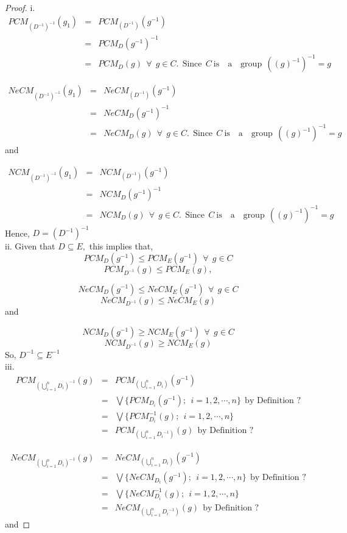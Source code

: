 \documentclass[12pt,letterpaper]{amsart}
\newcommand{\dis}{\displaystyle}
\theoremstyle{plain}
\theoremstyle{definition}
\numberwithin{equation}{section}
\begin{document}
\begin{proof}
i.
\begin{eqnarray*}
PCM_{(D^{-1})^{-1}}(g_1) & = & PCM_{(D^{-1})}(g^{-1})\\
& = & PCM_D(g^{-1})^{-1} \\
& = & PCM_D(g)~~ \forall~~ g \in C.~~ \text{Since}~~ C ~ \text{is~~ a~~ group}~~((g)^{-1})^{-1} = g
\end{eqnarray*}

\begin{eqnarray*}
NeCM_{(D^{-1})^{-1}}(g_1) & = & NeCM_{(D^{-1})}(g^{-1})\\
& = & NeCM_D(g^{-1})^{-1} \\
& = & NeCM_D(g)~~ \forall~~ g \in C.~~ \text{Since}~~ C ~ \text{is~~ a~~ group}~~((g)^{-1})^{-1} = g
\end{eqnarray*} and 

\begin{eqnarray*}
NCM_{(D^{-1})^{-1}}(g_1) & = & NCM_{(D^{-1})}(g^{-1})\\
& = & NCM_D(g^{-1})^{-1} \\
& = & NCM_D(g)~~ \forall~~ g \in C.~~ \text{Since}~~ C ~ \text{is~~ a~~ group}~~((g)^{-1})^{-1} = g
\end{eqnarray*}
Hence, $D = (D^{-1})^{-1}$\\

ii. Given that $D \subseteq E,$ this implies that, 
$$PCM_{D}(g^{-1}) \leq PCM_{E}(g^{-1})~~ \forall~~ g \in C$$
$$PCM_{D^{-1}}(g) \leq PCM_{E}(g),$$

$$NeCM_{D}(g^{-1}) \leq NeCM_{E}(g^{-1})~~ \forall~~ g \in C$$
$$NeCM_{D^{-1}}(g) \leq NeCM_{E}(g)$$ and 

$$NCM_{D}(g^{-1}) \geq NCM_{E}(g^{-1})~~ \forall~~ g \in C$$
$$NCM_{D^{-1}}(g) \geq NCM_{E}(g)$$ So, $D^{-1} \subseteq E^{-1}$\\

iii. \begin{eqnarray*}
PCM_{\dis \left(\bigcup^n_{i = 1} D_i\right)^{-1}}(g) & = & PCM_{\dis \left(\bigcup^n_{i = 1} D_i\right)}(g^{-1})\\
& = & \bigvee \lbrace  PCM_{D_i}(g^{-1});~~ i = 1, 2, \cdots, n \rbrace~~ \text{by~Definition ?} \\
& = & \bigvee \lbrace  PCM_{D_i}^{-1}(g);~~ i = 1, 2, \cdots, n \rbrace\\
& = & PCM_{\dis \left(\bigcup^n_{i = 1} {D_i}^{-1}\right)}(g)~~ \text{by~Definition ?}
\end{eqnarray*}

\begin{eqnarray*}
NeCM_{\dis \left(\bigcup^n_{i = 1} D_i\right)^{-1}}(g) & = & NeCM_{\dis \left(\bigcup^n_{i = 1} D_i\right)}(g^{-1})\\
& = & \bigvee \lbrace  NeCM_{D_i}(g^{-1});~~ i = 1, 2, \cdots, n \rbrace~~ \text{by~Definition ?} \\
& = & \bigvee \lbrace  NeCM_{D_i}^{-1}(g);~~ i = 1, 2, \cdots, n \rbrace\\
& = & NeCM_{\dis \left(\bigcup^n_{i = 1} {D_i}^{-1}\right)}(g)~~ \text{by~Definition ?}
\end{eqnarray*}
and


\end{proof}
\end{document}
